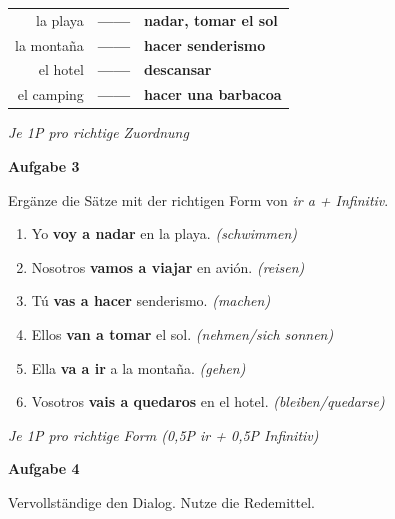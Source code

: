 \documentclass[11pt, a4paper]{article}
\newcommand{\fachfarbe}{spanisch}
\newcommand{\punktebox}[1]{\hfill\fbox{\small \_/#1}}
\newcommand{\loesung}[1]{\textcolor{loesung}{\textbf{#1}}}
\newenvironment{aufgabe}[1]{%
    \vspace{10pt}
    \noindent\textbf{\textcolor{\fachfarbe}{Aufgabe #1}}
    \vspace{5pt}
    \begin{list}{}{\leftmargin=0pt}
    \item[]
}{%
    \end{list}
}
\begin{document}
\begin{center}
\begin{tabular}{rcl}
la playa & \loesung{------} & \loesung{nadar, tomar el sol} \\[0.8em]
la montaña & \loesung{------} & \loesung{hacer senderismo} \\[0.8em]
el hotel & \loesung{------} & \loesung{descansar} \\[0.8em]
el camping & \loesung{------} & \loesung{hacer una barbacoa} \\
\end{tabular}
\end{center}

\textit{\textcolor{grau}{Je 1P pro richtige Zuordnung}}

\vspace{15pt}


\begin{aufgabe}{3}
Ergänze die Sätze mit der richtigen Form von \textit{ir a + Infinitiv}. \punktebox{6}
\end{aufgabe}

\begin{enumerate}[label=\alph*)]
    \item Yo \loesung{voy a nadar} en la playa. \textit{(schwimmen)}
    \item Nosotros \loesung{vamos a viajar} en avión. \textit{(reisen)}
    \item Tú \loesung{vas a hacer} senderismo. \textit{(machen)}
    \item Ellos \loesung{van a tomar} el sol. \textit{(nehmen/sich sonnen)}
    \item Ella \loesung{va a ir} a la montaña. \textit{(gehen)}
    \item Vosotros \loesung{vais a quedaros} en el hotel. \textit{(bleiben/quedarse)}
\end{enumerate}

\textit{\textcolor{grau}{Je 1P pro richtige Form (0,5P ir + 0,5P Infinitiv)}}

\vspace{15pt}


\begin{aufgabe}{4}
Vervollständige den Dialog. Nutze die Redemittel. \punktebox{6}
\end{aufgabe}
\end{document}
